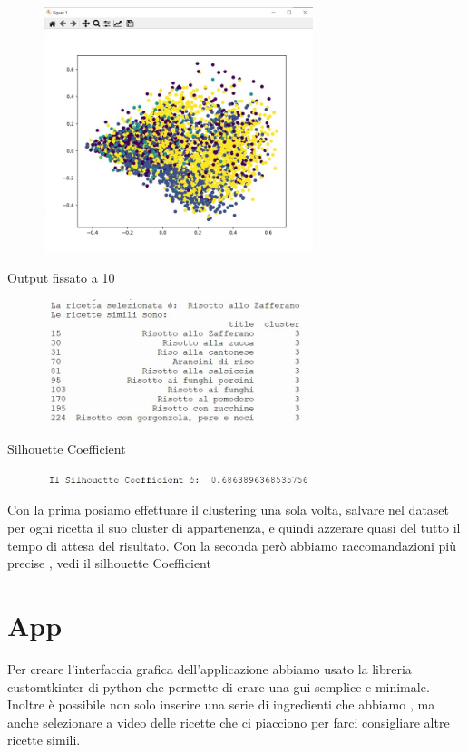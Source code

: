 \documentclass[12pt]{report}
\begin{document}
\begin{figure}[H]
        \centering
        {\includegraphics[width=0.7\textwidth]{img/img26.jpg}}
\end{figure}

Output fissato a 10

\begin{figure}[H]
        \centering
        {\includegraphics[width=0.7\textwidth]{img/img27.jpg}}
\end{figure}

Silhouette Coefficient

\begin{figure}[H]
        \centering
        {\includegraphics[width=0.7\textwidth]{img/img29.jpg}}
\end{figure}

Con la prima posiamo effettuare il clustering una sola volta, salvare nel dataset per ogni ricetta il suo cluster di appartenenza, e quindi azzerare quasi del tutto il tempo di attesa del risultato.
Con la seconda però abbiamo raccomandazioni più precise , vedi il silhouette Coefficient

\chapter{App}
Per creare l’interfaccia grafica dell’applicazione abbiamo usato la libreria customtkinter di python che permette di crare una gui semplice e minimale. Inoltre è possibile non solo inserire una serie di ingredienti che abbiamo , ma anche selezionare a video delle ricette che ci piacciono per farci consigliare altre ricette simili. 
\end{document}
